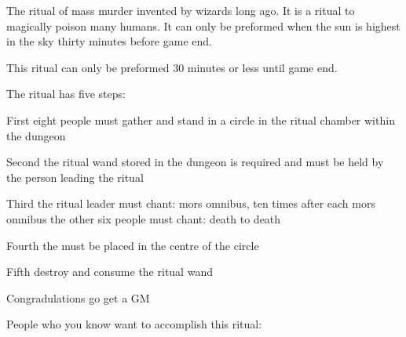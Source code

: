 \documentclass[green]{guildcamp2}
\begin{document}
\name{\gKillRitual{}}
The ritual of mass murder invented by wizards long ago. It is a ritual to magically poison many humans. It can only be preformed when the sun is highest in the sky thirty minutes before game end.

This ritual can only be preformed 30 minutes or less until game end.

The ritual has five steps: 

First eight people must gather and stand in a circle in the ritual chamber within the dungeon

Second the ritual wand stored in the dungeon is required and must be held by the person leading the ritual

Third the ritual leader must chant: mors omnibus, ten times after each mors omnibus the other six people must chant: death to death

Fourth the \iReaperIdol{} must be placed in the centre of the circle 

Fifth destroy and consume the ritual wand

Congradulations go get a GM

People who you know want to accomplish this ritual:
\cRed{}
\cLich{}

      
\end{document}
